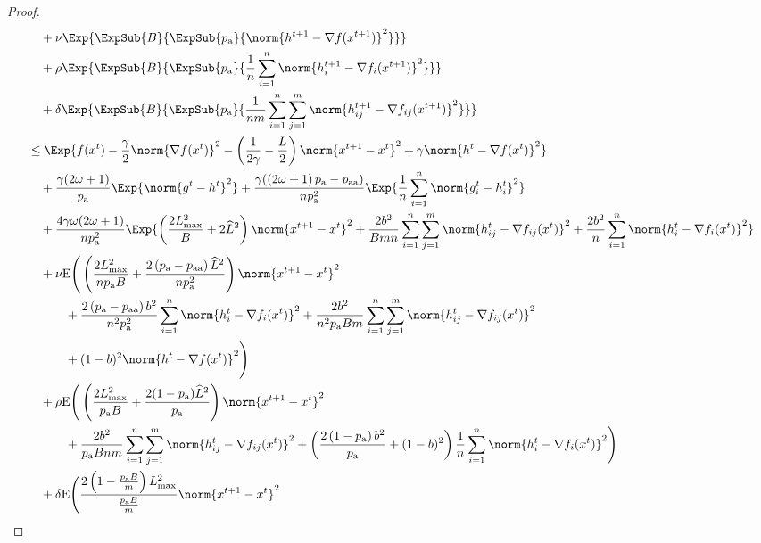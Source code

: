 \documentclass{article}
\newcommand*{\probavailable}{\ensuremath{p_{\textnormal{a}}}}
\newcommand*{\probpairaa}{\ensuremath{p_{\textnormal{aa}}}}
\begin{document}
\begin{proof}
\begin{align*}
      &\quad  + \nu \Exp{\ExpSub{B}{\ExpSub{\probavailable}{\norm{h^{t+1} - \nabla f(x^{t+1})}^2}}} \\
      &\quad + \rho \Exp{\ExpSub{B}{\ExpSub{\probavailable}{\frac{1}{n}\sum_{i=1}^n\norm{h^{t+1}_i - \nabla f_i(x^{t+1})}^2}}}\\
      &\quad + \delta \Exp{\ExpSub{B}{\ExpSub{\probavailable}{\frac{1}{nm}\sum_{i=1}^n\sum_{j=1}^m\norm{h^{t+1}_{ij} - \nabla f_{ij}(x^{t+1})}^2}}} \\
      &\leq \Exp{f(x^t) - \frac{\gamma}{2}\norm{\nabla f(x^t)}^2 - \left(\frac{1}{2\gamma} - \frac{L}{2}\right)
      \norm{x^{t+1} - x^t}^2 + \gamma \norm{h^{t} - \nabla f(x^t)}^2}\nonumber\\
      &\quad + \frac{\gamma (2 \omega + 1)}{\probavailable}\Exp{\norm{g^{t} - h^t}^2}+ \frac{\gamma (\left(2 \omega + 1\right)\probavailable - \probpairaa)}{n \probavailable^2}\Exp{\frac{1}{n} \sum_{i=1}^n\norm{g^t_i - h^{t}_i}^2} \\
      &\quad + \frac{4 \gamma \omega (2 \omega + 1)}{n \probavailable^2} \Exp{\left(\frac{2 L_{\max}^2}{B} + 2 \widehat{L}^2\right)\norm{x^{t+1} - x^{t}}^2 + \frac{2 b^2}{B m n}\sum_{i=1}^n \sum_{j=1}^m\norm{h^t_{ij} - \nabla f_{ij}(x^{t})}^2 + \frac{2 b^2}{n} \sum_{i=1}^n \norm{h^t_i - \nabla f_i(x^{t})}^2} \\
      &\quad  + \nu {\rm E}\Bigg(\left(\frac{2 L_{\max}^2}{n \probavailable B} + \frac{2 \left(\probavailable - \probpairaa\right) \widehat{L}^2}{n \probavailable^2}\right)\norm{x^{t+1} - x^{t}}^2  \\
      &\qquad\quad + \frac{2\left(\probavailable - \probpairaa\right)b^2}{n^2 \probavailable^2}\sum_{i=1}^n\norm{h^t_{i} - \nabla f_{i}(x^{t})}^2 + \frac{2b^2}{n^2 \probavailable B m}\sum_{i=1}^n\sum_{j=1}^m\norm{h^t_{ij} - \nabla f_{ij}(x^{t})}^2\\
      &\qquad\quad + (1 - b)^2\norm{h^{t} - \nabla f(x^{t})}^2\Bigg) \\
      &\quad + \rho {\rm E}\Bigg(\left(\frac{2 L_{\max}^2}{\probavailable B} +\frac{2(1 - \probavailable) \widehat{L}^2}{\probavailable}\right) \norm{x^{t+1} - x^{t}}^2 \\
      &\qquad\quad + \frac{2 b^2}{\probavailable B n m} \sum_{i=1}^n \sum_{j=1}^m\norm{h^t_{ij} - \nabla f_{ij}(x^{t})}^2 +\left(\frac{2 \left(1 - \probavailable\right) b^2}{\probavailable} + (1 - b)^2\right) \frac{1}{n} \sum_{i=1}^n \norm{h^{t}_i - \nabla f_i(x^{t})}^2\Bigg)\\
      &\quad + \delta {\rm E}\Bigg(\frac{2\left(1 - \frac{\probavailable B}{m}\right) L_{\max}^2}{\frac{\probavailable B}{m}} \norm{x^{t+1} - x^{t}}^2 \\

\end{align*}
\end{proof}
\end{document}

